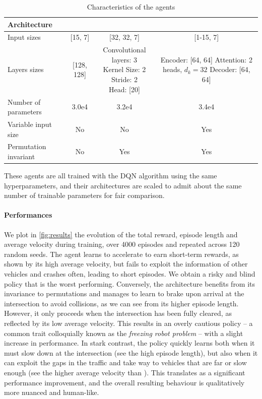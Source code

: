 \documentclass{article}
\begin{document}
\begin{table}[tp]
	\centering
	\begin{threeparttable}
		\caption{Characteristics of the agents}
		\label{tab:agents}
		\begin{tabular}{lccc}
			\toprule
			Architecture & \MLPL & \CNNG & \EgoAtt \\
			\midrule 
			Input sizes & [15, 7] & [32, 32, 7] & [1-15, 7] \\
			Layers sizes & [128, 128] &  \makecell[tc]{Convolutional layers: 3 \\ Kernel Size: 2 \\
			Stride: 2 \\ Head: [20]} & \makecell[tl]{Encoder: [64, 64] \\Attention: 2 heads, $d_k=32$ \\ Decoder: [64, 64]} \\
			Number of parameters & 3.0e4 & 3.2e4 & 3.4e4 \\
			Variable input size & No & No &  {Yes}  \\
			Permutation invariant & No & {Yes} &  {Yes} \\
			\bottomrule
		\end{tabular}
	\end{threeparttable}
\end{table}

These agents are all trained with the DQN algorithm using the same hyperparameters, and their architectures are scaled to admit about the same number of trainable parameters for fair comparison.

\paragraph{Performances}

We plot in \autoref{fig:results} the evolution of the total reward, episode length and average velocity during training, over 4000 episodes and repeated across 120 random seeds.
The \MLPL agent learns to accelerate to earn short-term rewards, as shown by its high average velocity, but fails to exploit the information of other vehicles and crashes often, leading to short episodes. We obtain a risky and blind policy that is the worst performing.
Conversely, the \CNNG architecture benefits from its invariance to permutations and manages to learn to brake upon arrival at the intersection to avoid collisions, as we can see from its higher episode length. However, it only proceeds when the intersection has been fully cleared, as reflected by its low average velocity. This results in an overly cautious policy -- a common trait colloquially known as the \emph{freezing robot problem} \citep{Trautman2010} -- with a slight increase in performance.
In stark contrast, the \EgoAtt policy quickly learns both when it must slow down at the intersection (see the high episode length), but also when it can exploit the gaps in the traffic and take way to vehicles that are far or slow enough (see the higher average velocity than \CNNG). This translates as a significant performance improvement, and the overall resulting behaviour is qualitatively more nuanced and human-like.
\end{document}
